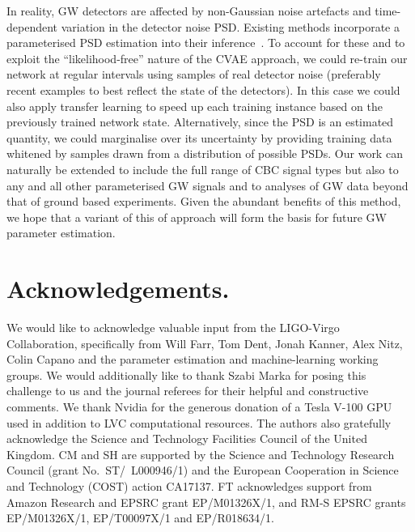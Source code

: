 \documentclass[%
showpacs,
nofootinbib,
 amsmath,amssymb,
 aps,
 twocolumn,
 prl,
 reprint,
floatfix,
]{revtex4-1}
\begin{document}
%
%
In reality, \ac{GW} detectors are affected by non-Gaussian noise artefacts and
time-dependent variation in the detector noise \ac{PSD}. Existing methods
incorporate a parameterised \ac{PSD} estimation into their
inference~\cite{2015PhRvD..91h4034L}. To account for these and to exploit the
``likelihood-free'' nature of the \ac{CVAE} approach, we could re-train our
network at regular intervals using samples of real detector noise (preferably
recent examples to best reflect the state of the detectors). In this case
we could also apply transfer learning to speed up each training instance based
on the previously trained network state.  Alternatively, since the \ac{PSD} is
an estimated quantity, we could marginalise over its uncertainty by providing
training data whitened by samples drawn from a distribution of possible
\acp{PSD}. Our work can naturally be extended to include the full range of
\ac{CBC} signal types but also to any and all other parameterised \ac{GW}
signals and to analyses of \ac{GW} data beyond that of ground based
experiments. Given the abundant benefits of this method, we hope that a variant
of this of approach will form the basis for future \ac{GW} parameter
estimation.

%
%

%
%
\section{Acknowledgements.}
%
We would like to acknowledge valuable input from the LIGO-Virgo Collaboration,
specifically from Will Farr, Tom Dent, Jonah Kanner, Alex Nitz, Colin Capano 
and the parameter estimation 
and machine-learning working groups. We would additionally like to thank Szabi 
Marka for posing this challenge to us and the journal referees for their 
helpful and constructive comments. We thank Nvidia for the generous donation 
of a Tesla V-100 GPU used in addition to \ac{LVC} computational resources. 
The authors also gratefully acknowledge the Science and Technology Facilities 
Council of the United Kingdom. CM and SH are supported by the Science and 
Technology Research Council (grant No.~ST/~L000946/1) and the European 
Cooperation in Science and Technology (COST) action CA17137. FT acknowledges 
support from Amazon Research and  EPSRC grant EP/M01326X/1, and RM-S EPSRC 
grants EP/M01326X/1, EP/T00097X/1 and EP/R018634/1. 

%
%
\end{document}
